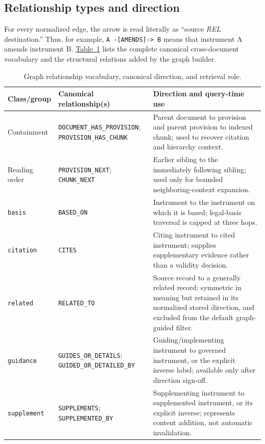 \subsection{Relationship types and direction}

For every normalized edge, the arrow is read literally as
``source \emph{REL} destination.'' Thus, for example,
\texttt{A -[AMENDS]-> B} means that instrument A amends instrument B.
\hyperref[tab:appendix-edge-vocabulary]{Table~\ref*{tab:appendix-edge-vocabulary}}
lists the complete canonical cross-document vocabulary and the structural
relations added by the graph builder.

\begin{table}[t]
\centering
\scriptsize
\caption{Graph relationship vocabulary, canonical direction, and retrieval role.}
\label{tab:appendix-edge-vocabulary}
\begin{tabular}{p{}p{}p{}}
\toprule
\textbf{Class/group} & \textbf{Canonical relationship(s)} & \textbf{Direction and query-time use} \\
\midrule
Containment & \texttt{DOCUMENT\_HAS\_PROVISION}; \texttt{PROVISION\_HAS\_CHUNK} & Parent document to provision and parent provision to indexed chunk; used to recover citation and hierarchy context. \\
Reading order & \texttt{PROVISION\_NEXT}; \texttt{CHUNK\_NEXT} & Earlier sibling to the immediately following sibling; used only for bounded neighboring-context expansion. \\
\texttt{basis} & \texttt{BASED\_ON} & Instrument to the instrument on which it is based; legal-basis traversal is capped at three hops. \\
\texttt{citation} & \texttt{CITES} & Citing instrument to cited instrument; supplies supplementary evidence rather than a validity decision. \\
\texttt{related} & \texttt{RELATED\_TO} & Source record to a generally related record; symmetric in meaning but retained in its normalized stored direction, and excluded from the default graph-guided filter. \\
\texttt{guidance} & \texttt{GUIDES\_OR\_DETAILS}; \texttt{GUIDED\_OR\_DETAILED\_BY} & Guiding/implementing instrument to governed instrument, or the explicit inverse label; available only after direction sign-off. \\
\texttt{supplement} & \texttt{SUPPLEMENTS}; \texttt{SUPPLEMENTED\_BY} & Supplementing instrument to supplemented instrument, or its explicit inverse; represents content addition, not automatic invalidation. \\

\end{tabular}
\end{table}
